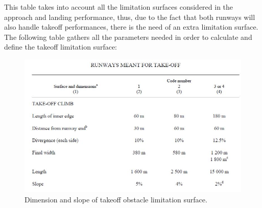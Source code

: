 	This table takes into account all the limitation surfaces considered in the approach and landing performance, thus, due to the fact that both runways will also handle takeoff performances, there is the need of an extra limitation surface. The following table gathers all the parameters needed in order to calculate and define the takeoff limitation surface:
	
	\begin{figure}[H]
		\centering
		\includegraphics[clip, trim=0cm 0cm 0cm 0cm, width=1\textwidth]{./images/servidumbres/taulatakeoff}
		\caption{Dimension and slope of takeoff obstacle limitation surface.}
		\label{}
	\end{figure}
	